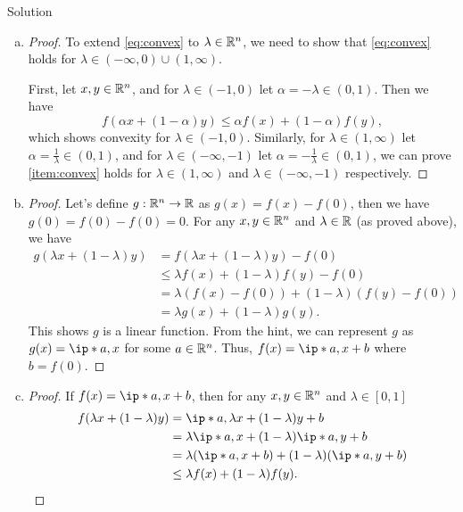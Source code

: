 \documentclass{article}
\begin{document}
\begin{solution}
    {Solution}
    \begin{enumerate}[(a)]
        \item {
            \begin{proof}
                To extend \cref{eq:convex} to $\lambda\in\mathbb{R}^n$, we need to show that \cref{eq:convex} holds for $\lambda\in(-\infty,0)\cup(1,\infty)$.

                First, let $x,y\in\mathbb{R}^n$, and for $\lambda\in(-1,0)$ let $\alpha=-\lambda\in(0,1)$. Then we have
                \[
                    f(\alpha x+(1-\alpha)y) \leq \alpha f(x)+(1-\alpha)f(y),
                \]
                which shows convexity for $\lambda\in(-1,0)$.
                Similarly, for $\lambda\in(1,\infty)$ let $\alpha=\frac{1}{\lambda}\in(0,1)$, and for $\lambda\in(-\infty,-1)$ let $\alpha=-\frac{1}{\lambda}\in(0,1)$, we can prove \cref{item:convex} holds for $\lambda\in(1,\infty)$ and $\lambda\in(-\infty,-1)$ respectively.
            \end{proof}
        }
        \item {
            \begin{proof}
                Let's define $g:\mathbb{R}^n\rightarrow\mathbb{R}$ as $g(x)=f(x)-f(0)$, then we have $g(0)=f(0)-f(0)=0$. For any $x,y\in\mathbb{R}^n$ and $\lambda\in\mathbb{R}$ (as proved above), we have
                \begin{align*}
                    g(\lambda x+(1-\lambda)y) &= f(\lambda x+(1-\lambda)y)-f(0)\\
                    &\leq \lambda f(x)+(1-\lambda)f(y)-f(0)\\
                    &= \lambda(f(x)-f(0))+(1-\lambda)(f(y)-f(0))\\
                    &= \lambda g(x)+(1-\lambda)g(y).
                \end{align*}
                This shows $g$ is a linear function. From the hint, we can represent $g$ as $g(x)=\ip*{a,x}$ for some $a\in\mathbb{R}^n$. Thus, $f(x)=\ip*{a,x}+b$ where $b=f(0)$.
            \end{proof}
        }
        \item {
            \begin{proof}
                If $f(x)=\ip*{a,x}+b$, then for any $x,y\in\mathbb{R}^n$ and $\lambda\in[0,1]$
                \begin{align*}
                    f(\lambda x+(1-\lambda)y) &= \ip*{a,\lambda x+(1-\lambda)y}+b\\
                    &= \lambda\ip*{a,x}+(1-\lambda)\ip*{a,y}+b\\
                    &= \lambda(\ip*{a,x}+b)+(1-\lambda)(\ip*{a,y}+b)\\
                    &\leq \lambda f(x)+(1-\lambda)f(y).
                \end{align*}
            \end{proof}
        }
    \end{enumerate}
\end{solution}
\end{document}
